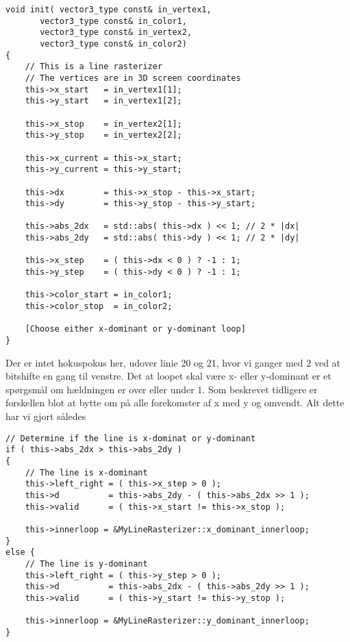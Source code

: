 \documentclass[a4paper, 10pt]{article}
\begin{document}
\begin{lstlisting}
void init( vector3_type const& in_vertex1,
	   vector3_type const& in_color1,
	   vector3_type const& in_vertex2,
	   vector3_type const& in_color2)
{
    // This is a line rasterizer
    // The vertices are in 3D screen coordinates
    this->x_start   = in_vertex1[1];
    this->y_start   = in_vertex1[2];
    
    this->x_stop    = in_vertex2[1];
    this->y_stop    = in_vertex2[2];

    this->x_current = this->x_start;
    this->y_current = this->y_start;

    this->dx	    = this->x_stop - this->x_start;
    this->dy	    = this->y_stop - this->y_start;

    this->abs_2dx   = std::abs( this->dx ) << 1; // 2 * |dx|
    this->abs_2dy   = std::abs( this->dy ) << 1; // 2 * |dy|

    this->x_step    = ( this->dx < 0 ) ? -1 : 1;
    this->y_step    = ( this->dy < 0 ) ? -1 : 1;

    this->color_start = in_color1;
    this->color_stop  = in_color2;

    [Choose either x-dominant or y-dominant loop]
}
\end{lstlisting}

Der er intet hokuspokus her, udover linie 20 og 21, hvor vi ganger med $2$ ved at bitshifte en gang til venstre.
Det at loopet skal være x- eller y-dominant er et spørgsmål om hældningen er over eller under $1$.
Som beskrevet tidligere er forskellen blot at bytte om på alle forekomster af x med y og omvendt.
Alt dette har vi gjort således

\lstset{firstnumber=29}
\begin{lstlisting}
// Determine if the line is x-dominat or y-dominant
if ( this->abs_2dx > this->abs_2dy )
{
    // The line is x-dominant
    this->left_right = ( this->x_step > 0 );
    this->d          = this->abs_2dy - ( this->abs_2dx >> 1 );
    this->valid      = ( this->x_start != this->x_stop );

    this->innerloop = &MyLineRasterizer::x_dominant_innerloop;
}
else {
    // The line is y-dominant
    this->left_right = ( this->y_step > 0 );
    this->d          = this->abs_2dx - ( this->abs_2dy >> 1 );
    this->valid      = ( this->y_start != this->y_stop );

    this->innerloop = &MyLineRasterizer::y_dominant_innerloop;
}
\end{lstlisting}
\end{document}
